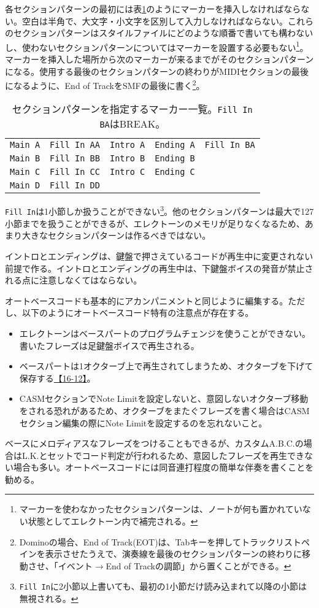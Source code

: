 \documentclass[uplatex, 10pt, dvipdfmx]{jsarticle}
\numberwithin{equation}{section}
\begin{document}
各セクションパターンの最初には表\ref{marker}のようにマーカーを挿入しなければならない。空白は半角で、大文字・小文字を区別して入力しなければならない。これらのセクションパターンはスタイルファイルにどのような順番で書いても構わないし、使わないセクションパターンについてはマーカーを設置する必要もない\footnote{マーカーを使わなかったセクションパターンは、ノートが何も置かれていない状態としてエレクトーン内で補完される。}。マーカーを挿入した場所から次のマーカーが来るまでがそのセクションパターンになる。使用する最後のセクションパターンの終わりがMIDIセクションの最後になるように、End of TrackをSMFの最後に書く\footnote{Dominoの場合、End of Track(EOT)は、Tabキーを押してトラックリストペインを表示させたうえで、演奏線を最後のセクションパターンの終わりに移動させ、「イベント$\rightarrow$End of Trackの調節」から置くことができる。}。

\begin{table}[h]
\caption{セクションパターンを指定するマーカー一覧。\texttt{Fill In BA}はBREAK。}
\label{marker}
\centering
\begin{tabular}{|c|c|c|c|c|}
\hline
\texttt{Main A} & \texttt{Fill In AA} & \texttt{Intro A} & \texttt{Ending A} & \texttt{Fill In BA} \\
\texttt{Main B} & \texttt{Fill In BB} & \texttt{Intro B} & \texttt{Ending B} & \\
\texttt{Main C} & \texttt{Fill In CC} & \texttt{Intro C} & \texttt{Ending C} & \\
\texttt{Main D} & \texttt{Fill In DD} & & & \\
\hline
\end{tabular}
\end{table}

\texttt{Fill In}は1小節しか扱うことができない\footnote{\texttt{Fill In}に2小節以上書いても、最初の1小節だけ読み込まれて以降の小節は無視される。}。他のセクションパターンは最大で127小節までを扱うことができるが、エレクトーンのメモリが足りなくなるため、あまり大きなセクションパターンは作るべきではない。

イントロとエンディングは、鍵盤で押さえているコードが再生中に変更されない前提で作る。イントロとエンディングの再生中は、下鍵盤ボイスの発音が禁止される点に注意しなくてはならない。

オートベースコードも基本的にアカンパニメントと同じように編集する。ただし、以下のようにオートベースコード特有の注意点が存在する。
\begin{itemize}
\item エレクトーンはベースパートのプログラムチェンジを使うことができない。書いたフレーズは足鍵盤ボイスで再生される。
\item ベースパートは1オクターブ上で再生されてしまうため、オクターブを下げて保存する\href{http://els01stylefile.music.coocan.jp/Stagea_Style/P1612.htm}{【16-12】}。
\item CASMセクションでNote Limitを設定しないと、意図しないオクターブ移動をされる恐れがあるため、オクターブをまたぐフレーズを書く場合はCASMセクション編集の際にNote Limitを設定するのを忘れないこと。
\end{itemize}
ベースにメロディアスなフレーズをつけることもできるが、カスタムA.B.C.の場合はL.K.とセットでコード判定が行われるため、意図したフレーズを再生できない場合も多い。オートベースコードには同音連打程度の簡単な伴奏を書くことを勧める。
\end{document}
